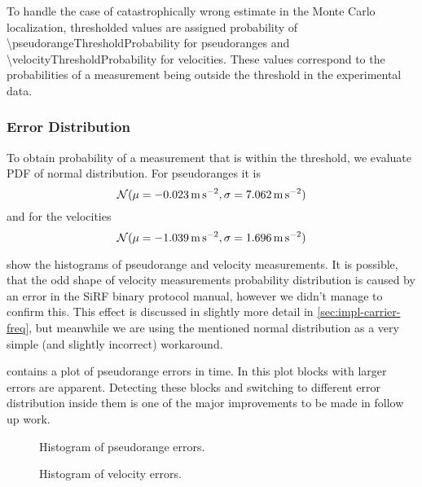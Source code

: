 To handle the case of catastrophically wrong estimate in the Monte Carlo localization,
thresholded values are assigned probability of \num{\pseudorangeThresholdProbability} for
pseudoranges and \num{\velocityThresholdProbability} for velocities.
These values correspond to the probabilities of a measurement being outside the
threshold in the experimental data.

\subsubsection{Error Distribution}
To obtain probability of a measurement that is within the threshold, we evaluate
PDF of normal distribution.
For pseudoranges it is
\begin{equation}
\operatorname{\mathcal{N}}(\mu = \SI{-0.023}{\meter\per\second\squared}, \sigma = \SI{7.062}{\meter\per\second\squared})
\end{equation}
and for the velocities
\begin{equation}
\operatorname{\mathcal{N}}(\mu = \SI{-1.039}{\meter\per\second\squared}, \sigma = \SI{1.696}{\meter\per\second\squared})
\end{equation}

 show the histograms of pseudorange
and velocity measurements.
It is possible, that the odd shape of velocity measurements probability distribution
is caused by an error in the SiRF binary protocol manual, however we didn't manage
to confirm this.
This effect is discussed in slightly more detail in \cref{sec:impl-carrier-freq},
but meanwhile we are using the mentioned normal distribution as a very simple
(and slightly incorrect) workaround.

 contains a plot of pseudorange errors in time.
In this plot blocks with larger errors are apparent.
Detecting these blocks and switching to different error distribution inside them
is one of the major improvements to be made in follow up work.

\begin{figure}[htp]
	\centering
	\caption{Histogram of pseudorange errors.}
	\label{fig:pseudorange-hist}
\end{figure}

\begin{figure}[htp]
	\centering
	\caption{Histogram of velocity errors.}
	\label{fig:velocity-hist}
\end{figure}


